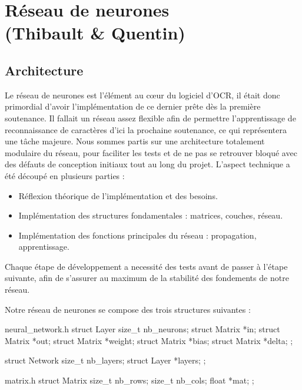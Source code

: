\chapter{Réseau de neurones \\(Thibault \& Quentin)}

\section{Architecture}

Le réseau de neurones est l'élément au cœur du logiciel d'OCR, il était donc
primordial d'avoir l'implémentation de ce dernier prête dès la première
soutenance. Il fallait un réseau assez flexible afin de permettre
l'apprentissage de reconnaissance de caractères d'ici la prochaine soutenance,
ce qui représentera une tâche majeure. Nous sommes partis sur une architecture
totalement modulaire du réseau, pour faciliter les tests et de ne pas se
retrouver bloqué avec des défauts de conception initiaux tout au long du projet.
L'aspect technique a été découpé en plusieurs parties :

\begin{itemize}
    \item Réflexion théorique de l'implémentation et des besoins.
    \item Implémentation des structures fondamentales : matrices, couches,
        réseau.
    \item Implémentation des fonctions principales du réseau : propagation,
        apprentissage.
\end{itemize}

Chaque étape de développement a necessité des tests avant de passer à l'étape
suivante, afin de s'assurer au maximum de la stabilité des fondements de notre
réseau.

\newpage

Notre réseau de neurones se compose des trois structures suivantes :

\begin{myminted}{neural\_network.h}
struct Layer
{
    size_t nb_neurons;
    struct Matrix *in;
    struct Matrix *out;
    struct Matrix *weight;
    struct Matrix *bias;
    struct Matrix *delta;
};

struct Network
{
    size_t nb_layers;
    struct Layer *layers;
};
\end{myminted}

\begin{myminted}{matrix.h}
struct Matrix
{
    size_t nb_rows;
    size_t nb_cols;
    float *mat;
};
\end{myminted}

